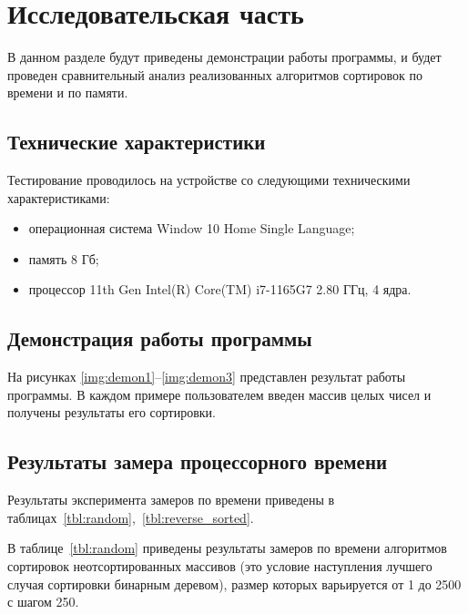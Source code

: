 \chapter{Исследовательская часть}

В данном разделе будут приведены демонстрации работы программы, и будет проведен сравнительный анализ реализованных алгоритмов сортировок по времени и по памяти.

\section{Технические характеристики}

Тестирование проводилось на устройстве со следующими техническими характеристиками:

\begin{itemize}
	\item операционная система Window 10 Home Single Language;
	\item память 8 Гб;
	\item процессор 11th Gen Intel(R) Core(TM) i7-1165G7 2.80 ГГц, 4 ядра.
\end{itemize}

\section{Демонстрация работы программы}

На рисунках \ref{img:demon1}--\ref{img:demon3} представлен результат работы программы. В каждом примере пользователем введен массив целых чисел и получены результаты его сортировки.

\clearpage


\section{Результаты замера процессорного времени}

Результаты эксперимента замеров по времени приведены в таблицах~\ref{tbl:random},~\ref{tbl:reverse_sorted}.

В таблице~\ref{tbl:random} приведены результаты замеров по времени алгоритмов сортировок неотсортированных массивов (это условие наступления лучшего случая сортировки бинарным деревом), размер которых варьируется от 1 до 2500 с шагом 250. 

